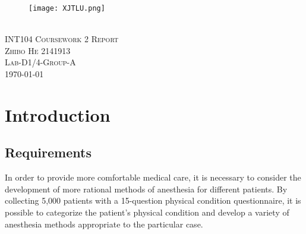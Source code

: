 \documentclass[10pt,twocolumn]{article}
\begin{document}
	\begin{titlepage}
		\begin{center}
			\begin{figure}[h]
				\centering
				\texttt{[image: XJTLU.png]}
			\end{figure}
			\textsc{
				\\[2.5cm]
				\Huge{INT104 Coursework 2 Report}\\[2.5cm]
				\LARGE
				Zhibo He 2141913
				\\[1cm]
				Lab-D1/4-Group-A
				\\[1cm]
				{\today}\\[.5cm]
			}
		\end{center}
	\end{titlepage}
	
	\section{Introduction}
	\subsection{Requirements}
	In order to provide more comfortable medical care, it is necessary to consider the development of more rational methods of anesthesia for different patients. By collecting 5,000 patients with a 15-question physical condition questionnaire, it is possible to categorize the patient's physical condition and develop a variety of anesthesia methods appropriate to the particular case.
\end{document}
